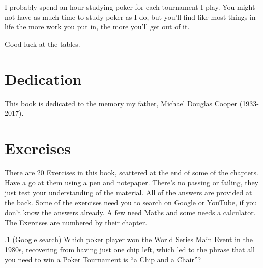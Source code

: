 I probably spend an hour studying poker for each tournament I play.
You might not have as much time to study poker as I do, but you'll
find like most things in life the more work you put in, the
more you'll get out of it.

Good luck at the tables.

\section*{Dedication}

This book is dedicated to the memory my father,
Michael Douglas Cooper (1933-2017).

\section{Exercises}


There are 20 Exercises in this book, scattered at the end of some of
the chapters. Have a go at them using a pen and notepaper. There's no
passing or failing, they just test your understanding of the
material. All of the answers are provided at the back. Some of the
exercises need you to search on Google or YouTube, if you don't know
the answers already. A few need Maths and some needs a calculator. The
Exercises are numbered by their chapter.

.1 (Google search) Which poker player won the World
Series Main Event in the 1980s, recovering from having just one chip
left, which led to the phrase that all you need to win a Poker
Tournament is ``a Chip and a Chair''?






